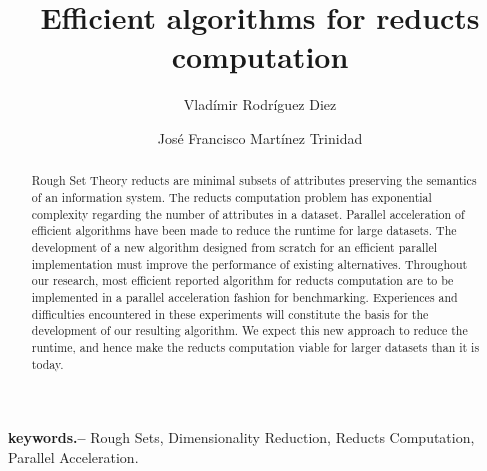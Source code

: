 \documentclass[11pt]{article}   %
\begin{document}
\title{Efficient algorithms for reducts computation}
\author{Vlad\'imir Rodr\'iguez Diez \and Jos\'e Francisco Mart\'inez Trinidad
 }
\maketitle


\begin{abstract}
    Rough Set Theory reducts are minimal subsets of attributes preserving the semantics of an 
    information system. The reducts computation problem has exponential complexity regarding the number of 
    attributes in a dataset. Parallel acceleration of efficient algorithms have been made to
    reduce the runtime for large datasets. The development of a new algorithm designed from scratch
    for an efficient parallel implementation must improve the performance of existing alternatives. 
    Throughout our research, most efficient reported algorithm for reducts computation are to be 
    implemented in a parallel acceleration fashion for benchmarking. Experiences and difficulties 
    encountered in these experiments will constitute the basis for the development of our resulting algorithm. 
    We expect this new approach to reduce the runtime, and hence make the reducts computation viable for 
    larger datasets than it is today.
\end{abstract}

\textbf{keywords.--} Rough Sets, Dimensionality Reduction, Reducts Computation, Parallel Acceleration.

\pagebreak 
\tableofcontents
\pagebreak 

\end{document}
